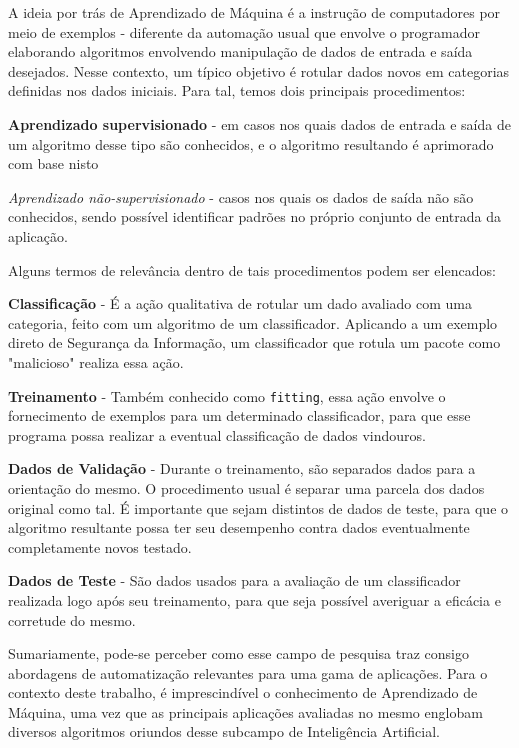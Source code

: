 A ideia por trás de Aprendizado de Máquina \cite{dantas_transformers_2021} é a instrução de computadores por meio de exemplos - diferente da automação usual que envolve o programador elaborando algoritmos envolvendo manipulação de dados de entrada e saída desejados. Nesse contexto, um típico objetivo é rotular dados novos em categorias definidas nos dados iniciais. Para tal, temos dois principais procedimentos:
\begin{alineas}
\item \textbf{Aprendizado supervisionado} - em casos nos quais dados de entrada e saída de um algoritmo desse tipo são conhecidos, e o algoritmo resultando é aprimorado com base nisto
\item \textit{Aprendizado não-supervisionado} - casos nos quais os dados de saída não são conhecidos, sendo possível identificar padrões no próprio conjunto de entrada da aplicação.
\end{alineas}

Alguns termos de relevância dentro de tais procedimentos podem ser elencados:
\begin{alineas}
\item \textbf{Classificação} - É a ação qualitativa de rotular um dado avaliado com uma categoria, feito com um algoritmo de um classificador. Aplicando a um exemplo direto de Segurança da Informação, um classificador que rotula um pacote como "malicioso" realiza essa ação.
\item \textbf{Treinamento} - Também conhecido como \verb+fitting+, essa ação envolve o fornecimento de exemplos para um determinado classificador, para que esse programa possa realizar a eventual classificação de dados vindouros.
\item \textbf{Dados de Validação} - Durante o treinamento, são separados dados para a orientação do mesmo. O procedimento usual é separar uma parcela dos dados original como tal. É importante que sejam distintos de dados de teste, para que o algoritmo resultante possa ter seu desempenho contra dados eventualmente completamente novos testado.
\item \textbf{Dados de Teste} - São dados usados para a avaliação de um classificador realizada logo após seu treinamento, para que seja possível averiguar a eficácia e corretude do mesmo.
\end{alineas}

Sumariamente, pode-se perceber como esse campo de pesquisa traz consigo abordagens de automatização relevantes para uma gama de aplicações. Para o contexto deste trabalho, é imprescindível o conhecimento de Aprendizado de Máquina, uma vez que as principais aplicações avaliadas no mesmo englobam diversos algoritmos oriundos desse subcampo de Inteligência Artificial.

